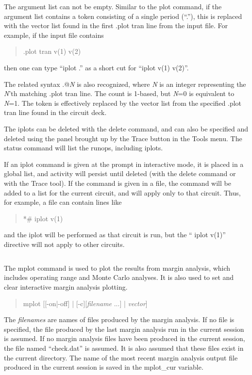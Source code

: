 The argument list can not be empty.  Similar to the {\cb plot}
command, if the argument list contains a token consisting of a single
period (``{\vt .}''), this is replaced with the vector list found in
the first {\vt .plot tran} line from the input file.  For example, if
the input file contains
\begin{quote} \vt
.plot tran v(1) v(2)
\end{quote}
then one can type ``{\vt iplot .}'' as a short cut for ``{\vt iplot
v(1) v(2)}''.

The related syntax {\vt .@}{\it N} is also recognized, where {\it N}
is an integer representing the {\it N\/}'th matching {\vt .plot tran}
line.  The count is 1-based, but {\it N\/}=0 is equivalent to {\it
N\/}=1.  The token is effectively replaced by the vector list from the
specified {\vt .plot tran} line found in the circuit deck.

The iplots can be deleted with the {\cb delete} command, and can also
be specified and deleted using the panel brought up by the {\cb Trace}
button in the {\cb Tools} menu.  The {\cb status} command will list
the runops, including iplots.

If an {\cb iplot} command is given at the prompt in interactive mode,
it is placed in a global list, and activity will persist until deleted
(with the {\cb delete} command or with the {\cb Trace} tool).  If the
command is given in a file, the command will be added to a list for
the current circuit, and will apply only to that circuit.  Thus, for
example, a {\WRspice} file can contain lines like
\begin{quote}\vt
*\# iplot v(1)
\end{quote}
and the iplot will be performed as that circuit is run, but the ``{\vt
iplot v(1)}'' directive will not apply to other circuits.

\subsection{}
\label{mplot}


The {\cb mplot} command is used to plot the results from margin analysis,
which includes operating range and Monte Carlo analyses.  It is also used
to set and clear interactive margin analysis plotting.
\begin{quote}\vt
mplot [[-on|-off] | [-c][{\it filename} ...] | {\it vector\/}]
\end{quote}
The {\it filenames} are names of files produced by the margin
analysis.  If no file is specified, the file produced by the last
margin analysis run in the current session is assumed.  If no margin
analysis files have been produced in the current session, the file
named ``{\vt check.dat}'' is assumed.  It is also assumed that these
files exist in the current directory.  The name of the most recent
margin analysis output file produced in the current session is saved
in the {\et mplot\_cur} variable.

